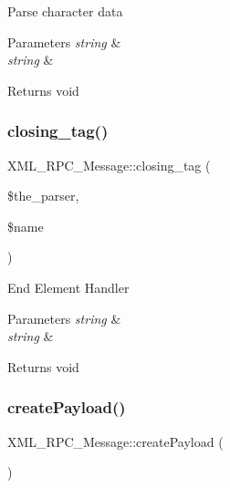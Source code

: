 Parse character data


\begin{DoxyParams}{Parameters}
{\em string} & \\
\hline
{\em string} & \\
\hline
\end{DoxyParams}
\begin{DoxyReturn}{Returns}
void 
\end{DoxyReturn}
\mbox{\label{class_x_m_l___r_p_c___message_ada6db8b706d06d6a4b5151cbccdc2273}} 
\subsubsection{\texorpdfstring{closing\+\_\+tag()}{closing\_tag()}}
{\footnotesize\ttfamily X\+M\+L\+\_\+\+R\+P\+C\+\_\+\+Message\+::closing\+\_\+tag (\begin{DoxyParamCaption}\item[{}]{\$the\+\_\+parser,  }\item[{}]{\$name }\end{DoxyParamCaption})}

End Element Handler


\begin{DoxyParams}{Parameters}
{\em string} & \\
\hline
{\em string} & \\
\hline
\end{DoxyParams}
\begin{DoxyReturn}{Returns}
void 
\end{DoxyReturn}
\mbox{\label{class_x_m_l___r_p_c___message_ac1398abb63f531a8c9ed9093895d9b42}} 
\subsubsection{\texorpdfstring{create\+Payload()}{createPayload()}}
{\footnotesize\ttfamily X\+M\+L\+\_\+\+R\+P\+C\+\_\+\+Message\+::create\+Payload (\begin{DoxyParamCaption}{ }\end{DoxyParamCaption})}

